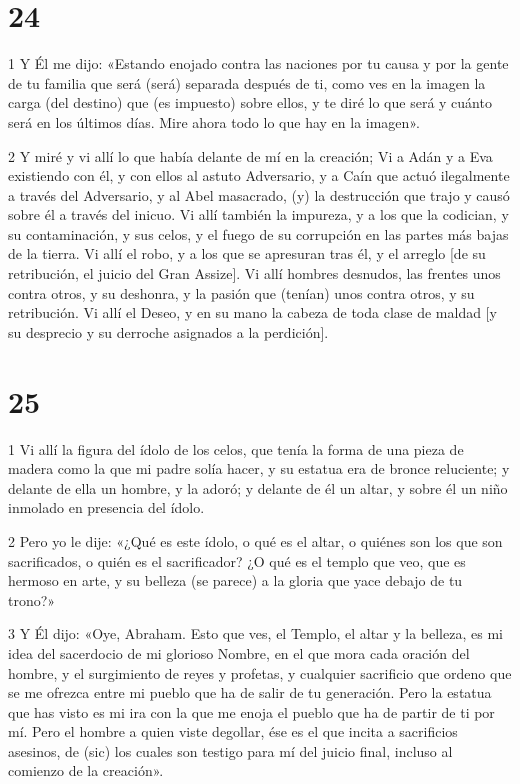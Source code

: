 \chapter{24}

\par 1 Y Él me dijo: «Estando enojado contra las naciones por tu causa y por la gente de tu familia que será (será) separada después de ti, como ves en la imagen la carga (del destino) que (es impuesto) sobre ellos, y te diré lo que será y cuánto será en los últimos días. Mire ahora todo lo que hay en la imagen».

\par 2 Y miré y vi allí lo que había delante de mí en la creación; Vi a Adán y a Eva existiendo con él, y con ellos al astuto Adversario, y a Caín que actuó ilegalmente a través del Adversario, y al Abel masacrado, (y) la destrucción que trajo y causó sobre él a través del inicuo. Vi allí también la impureza, y a los que la codician, y su contaminación, y sus celos, y el fuego de su corrupción en las partes más bajas de la tierra. Vi allí el robo, y a los que se apresuran tras él, y el arreglo [de su retribución, el juicio del Gran Assize]. Vi allí hombres desnudos, las frentes unos contra otros, y su deshonra, y la pasión que (tenían) unos contra otros, y su retribución. Vi allí el Deseo, y en su mano la cabeza de toda clase de maldad [y su desprecio y su derroche asignados a la perdición].

\chapter{25}

\par 1 Vi allí la figura del ídolo de los celos, que tenía la forma de una pieza de madera como la que mi padre solía hacer, y su estatua era de bronce reluciente; y delante de ella un hombre, y la adoró; y delante de él un altar, y sobre él un niño inmolado en presencia del ídolo.

\par 2 Pero yo le dije: «¿Qué es este ídolo, o qué es el altar, o quiénes son los que son sacrificados, o quién es el sacrificador? ¿O qué es el templo que veo, que es hermoso en arte, y su belleza (se parece) a la gloria que yace debajo de tu trono?»

\par 3 Y Él dijo: «Oye, Abraham. Esto que ves, el Templo, el altar y la belleza, es mi idea del sacerdocio de mi glorioso Nombre, en el que mora cada oración del hombre, y el surgimiento de reyes y profetas, y cualquier sacrificio que ordeno que se me ofrezca entre mi pueblo que ha de salir de tu generación. Pero la estatua que has visto es mi ira con la que me enoja el pueblo que ha de partir de ti por mí. Pero el hombre a quien viste degollar, ése es el que incita a sacrificios asesinos, de (sic) los cuales son testigo para mí del juicio final, incluso al comienzo de la creación».


